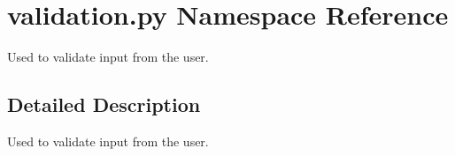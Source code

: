 \hypertarget{namespacevalidation_1_1py}{}\section{validation.\+py Namespace Reference}
\label{namespacevalidation_1_1py}


Used to validate input from the user.  




\subsection{Detailed Description}
Used to validate input from the user. 
